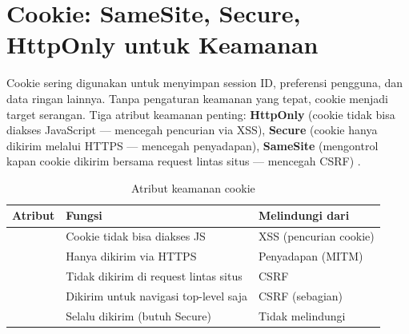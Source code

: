 ﻿\section{Cookie: SameSite, Secure, HttpOnly untuk Keamanan}

Cookie sering digunakan untuk menyimpan session ID, preferensi pengguna, dan data ringan lainnya. Tanpa pengaturan keamanan yang tepat, cookie menjadi target serangan. Tiga atribut keamanan penting: \textbf{HttpOnly} (cookie tidak bisa diakses JavaScript --- mencegah pencurian via XSS), \textbf{Secure} (cookie hanya dikirim melalui HTTPS --- mencegah penyadapan), \textbf{SameSite} (mengontrol kapan cookie dikirim bersama request lintas situs --- mencegah CSRF) \cite{owaspCsrf}.

\begin{table}[H]
\centering
\begin{tabular}{|P{2.5cm}|P{5cm}|P{5cm}|}
\hline
\textbf{Atribut} & \textbf{Fungsi} & \textbf{Melindungi dari} \\
\hline
{} & Cookie tidak bisa diakses JS & XSS (pencurian cookie) \\
\hline
{} & Hanya dikirim via HTTPS & Penyadapan (MITM) \\
\hline
{} & Tidak dikirim di request lintas situs & CSRF \\
\hline
{} & Dikirim untuk navigasi top-level saja & CSRF (sebagian) \\
\hline
{} & Selalu dikirim (butuh Secure) & Tidak melindungi \\
\hline
\end{tabular}
\caption{Atribut keamanan cookie}
\end{table}

